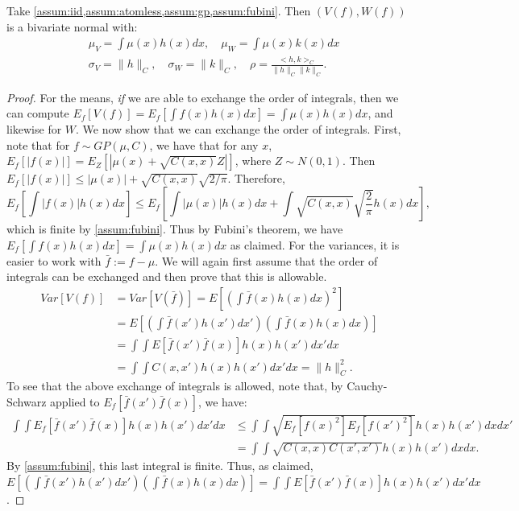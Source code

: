 \begin{lemma} \label{lem:vw_bivariate}
	Take \cref{assum:iid,assum:atomless,assum:gp,assum:fubini}. Then $(V(f), W(f))$ is a bivariate normal with:
	\begin{align}
		& \mu_V = \int \mu(x) h(x) dx, \quad \mu_W = \int \mu(x) k(x) dx \\
		& \sigma_V = \| h \|_C, \quad \sigma_W = \| k \|_C, \quad \rho = \frac{<h,k>_C}{\| h \|_C \| k \|_C}.
	\end{align}
\end{lemma}
\begin{proof}
For the means, \emph{if} we are able to exchange the order of integrals, then we can compute $E_f[V(f)] = E_f [ \int f(x) h(x) dx] = \int \mu(x) h(x) dx$, and likewise for $W$.
We now show that we can exchange the order of integrals.
First, note that for $f \sim GP(\mu, C)$, we have that for any $x$, $E_f [|f(x)|] = E_Z [| \mu(x) + \sqrt{C(x,x)} Z|]$, where $Z \sim N(0,1)$. Then $E_f [|f(x)|] \leq |\mu(x)| + \sqrt{C(x,x)} \sqrt{2/\pi}$.
Therefore,
\begin{equation}
	E_f \left[ \int |f(x)| h(x) dx \right] \leq E_f \left[ \int | \mu(x) | h(x) dx + \int \sqrt{C(x,x)} \sqrt{\frac{2}{\pi}} h(x) dx \right],
\end{equation}	
which is finite by \cref{assum:fubini}. Thus by Fubini's theorem, we have $E_f [ \int f(x) h(x) dx] = \int \mu(x) h(x) dx$ as claimed.
For the variances, it is easier to work with $\bar f := f - \mu$.
We will again first assume that the order of integrals can be exchanged and then prove that this is allowable.
\begin{align*}
	Var[V(f)] &= Var[V(\bar f)] = E \left[ \left( \int \bar f(x) h(x) dx \right)^2 \right] \\
	&= E \left[ \left(\int \bar f(x') h(x') dx' \right) \left( \int \bar f(x) h(x) dx \right) \right] \\
	&= \int\int E[ \bar f(x') \bar f(x)] h(x) h(x') dx' dx \\
	&= \int\int C(x,x') h(x) h(x') dx' dx = \| h \|_C^2.
\end{align*}
To see that the above exchange of integrals is allowed, note that, by Cauchy-Schwarz applied to $E_f[ \bar f(x') \bar f(x)]$, we have:
\begin{align*}
	\int\int E_f[ \bar f(x') \bar f(x)] h(x) h(x') dx' dx &\leq \int\int \sqrt{E_f[ f(x)^2] E_f[f(x')^2]} h(x) h(x') dx dx' \\
	&= \int\int \sqrt{C(x,x) C(x',x')} h(x) h(x') dx dx.
\end{align*}
By \cref{assum:fubini}, this last integral is finite.
Thus, as claimed, $E \left[ \left(\int \bar f(x') h(x') dx' \right) \left( \int \bar f(x) h(x) dx \right) \right] = \int\int E[ \bar f(x') \bar f(x)] h(x) h(x') dx' dx$.


\end{proof}
